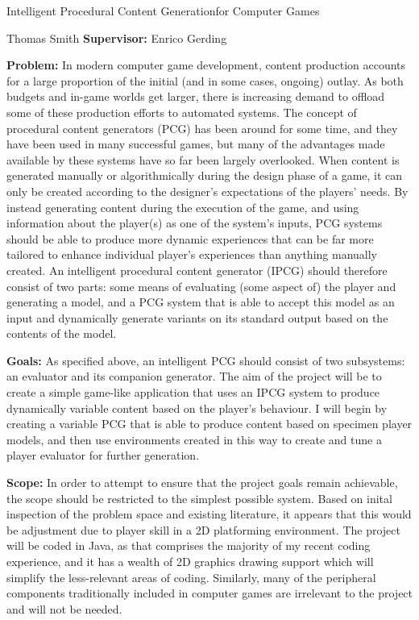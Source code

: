 \documentclass[12pt]{article}
\date{}
\begin{document}
\begin{center}
{\LARGE Intelligent Procedural Content Generation\linebreak for Computer Games}


Thomas Smith \linebreak
{\bf Supervisor:} Enrico Gerding
\end{center}

{\bf Problem:} In modern computer game development, content production accounts for a large proportion of the initial (and in some cases, ongoing) outlay. As both budgets and in-game worlds get larger, there is increasing demand to offload some of these production efforts to automated systems. The concept of procedural content generators (PCG) has been around for some time, and they have been used in many successful games, but many of the advantages made available by these systems have so far been largely overlooked. When content is generated manually or algorithmically during the design phase of a game, it can only be created according to the designer's expectations of the players' needs. By instead generating content during the execution of the game, and using information about the player(s) as one of the system's inputs, PCG systems should be able to produce more dynamic experiences that can be far more tailored to enhance individual player's experiences than anything manually created. An intelligent procedural content generator (IPCG) should therefore consist of two parts: some means of evaluating (some aspect of) the player and generating a model, and a PCG system that is able to accept this model as an input and dynamically generate variants on its standard output based on the contents of the model.


{\bf Goals:} As specified above, an intelligent PCG should consist of two subsystems: an evaluator and its companion generator. The aim of the project will be to create a simple game-like application that uses an IPCG system to produce dynamically variable content based on the player's behaviour. I will begin by creating a variable PCG that is able to produce content based on specimen player models, and then use environments created in this way to create and tune a player evaluator for further generation.

{\bf Scope:} In order to attempt to ensure that the project goals remain achievable, the scope should be restricted to the simplest possible system. Based on inital inspection of the problem space and existing literature, it appears that this would be adjustment due to player skill in a 2D platforming environment. The project will be coded in Java, as that comprises the majority of my recent coding experience, and it has a wealth of 2D graphics drawing support which will simplify the less-relevant areas of coding. Similarly, many of the peripheral components traditionally included in computer games are irrelevant to the project and will not be needed.
\end{document}
